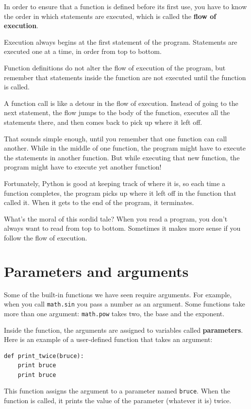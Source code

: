 \documentclass[10pt]{book}
\begin{document}
In order to ensure that a function is defined before its first use,
you have to know the order in which statements are executed, which is
called the {\bf flow of execution}.

Execution always begins at the first statement of the program.
Statements are executed one at a time, in order from top to bottom.

Function definitions do not alter the flow of execution of the
program, but remember that statements inside the function are not
executed until the function is called.

A function call is like a detour in the flow of execution. Instead of
going to the next statement, the flow jumps to the body of
the function, executes all the statements there, and then comes back
to pick up where it left off.

That sounds simple enough, until you remember that one function can
call another.  While in the middle of one function, the program might
have to execute the statements in another function. But while
executing that new function, the program might have to execute yet
another function!

Fortunately, Python is good at keeping track of where it is, so each
time a function completes, the program picks up where it left off in
the function that called it.  When it gets to the end of the program,
it terminates.

What's the moral of this sordid tale?  When you read a program, you
don't always want to read from top to bottom.  Sometimes it makes
more sense if you follow the flow of execution.


\section{Parameters and arguments}
\label{parameters}

Some of the built-in functions we have seen require arguments.  For
example, when you call {\tt math.sin} you pass a number
as an argument.  Some functions take more than one argument:
{\tt math.pow} takes two, the base and the exponent.

Inside the function, the arguments are assigned to
variables called {\bf parameters}.  Here is an example of a
user-defined function that takes an argument:

\begin{verbatim}
def print_twice(bruce):
    print bruce
    print bruce
\end{verbatim}
%
This function assigns the argument to a parameter
named {\tt bruce}.  When the function is called, it prints the value of
the parameter (whatever it is) twice.
\end{document}
